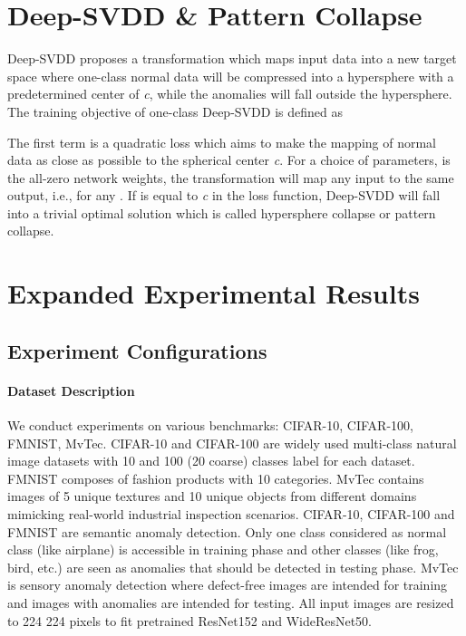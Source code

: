 \documentclass{article}
\begin{document}
\clearpage





\cleardoublepage
\appendix
{}
\vspace{0.4cm}

\section{Deep-SVDD \& Pattern Collapse}

Deep-SVDD proposes a transformation  which maps input data  into a new target space where one-class normal data will be compressed into a hypersphere with a predetermined center of \textit{c}, while the anomalies will fall outside the hypersphere. The training objective of one-class Deep-SVDD is defined as

The first term is a quadratic loss which aims to make the mapping of normal data as close as possible to the spherical center \textit{c}. For a choice of parameters,  is the all-zero network weights, the transformation will map any input to the same output, i.e.,  for any . If  is equal to \textit{c} in the loss function, Deep-SVDD will fall into a trivial optimal solution which is called hypersphere collapse or pattern collapse.


\section{Expanded Experimental Results}


\subsection{Experiment Configurations}
\paragraph{Dataset Description}
We conduct experiments on various benchmarks: CIFAR-10, CIFAR-100, FMNIST, MvTec. CIFAR-10 and CIFAR-100 are widely used multi-class natural image datasets with 10 and 100 (20 coarse) classes label for each dataset. FMNIST composes of fashion products with 10 categories.  MvTec contains images of 5 unique textures and 10 unique objects from different domains mimicking real-world industrial inspection scenarios. CIFAR-10, CIFAR-100 and FMNIST are semantic anomaly detection. Only one class considered as normal class (like airplane) is accessible in training phase and other classes (like frog, bird, etc.) are seen as anomalies that should be detected in testing phase. MvTec is sensory anomaly detection where defect-free images are intended for training and images with anomalies are intended for testing. All input images are resized to 224  224 pixels to fit pretrained ResNet152 and WideResNet50.
\end{document}
